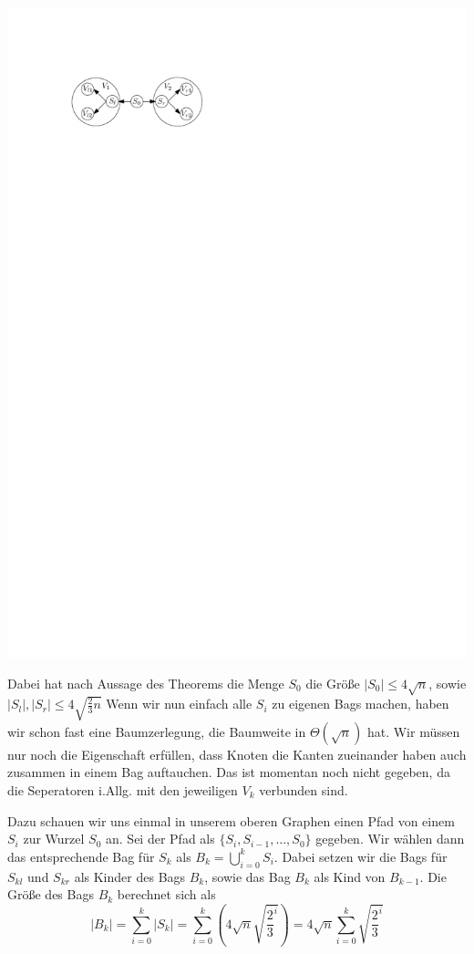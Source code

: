 \begin{center}
    \vspace{1ex}
    \includegraphics[page=1]{fig/02-A3}
  \end{center}

Dabei hat nach Aussage des Theorems die Menge $S_0$ die Größe $|S_0| \leq 4\sqrt{n}$, sowie $|S_l|,|S_r| \leq 4\sqrt{\frac{2}{3}n}$
Wenn wir nun einfach alle $S_i$ zu eigenen Bags machen, haben wir schon fast eine Baumzerlegung, die Baumweite in $\Theta(\sqrt{n})$ hat.
Wir müssen nur noch die Eigenschaft erfüllen, dass Knoten die Kanten zueinander haben auch zusammen in einem Bag auftauchen. Das ist momentan noch nicht gegeben, da die Seperatoren i.Allg. mit den jeweiligen $V_k$ verbunden sind.

Dazu schauen wir uns einmal in unserem oberen Graphen einen Pfad von einem $S_i$ zur Wurzel $S_0$ an. Sei der Pfad als $\{S_i, S_{i-1}, \dots, S_0\}$ gegeben.
Wir wählen dann das entsprechende Bag für $S_k$ als $B_k = \bigcup\limits_{i=0}^k S_i$. Dabei setzen wir die Bags für $S_{kl}$ und $S_{kr}$ als Kinder des Bags $B_k$, sowie das Bag $B_k$ als Kind von $B_{k-1}$.
Die Größe des Bags $B_k$ berechnet sich als
$$ |B_k| = \sum\limits_{i=0}^k |S_k| = \sum\limits_{i=0}^k \left(4\sqrt{n}\sqrt{\frac{2}{3}^i}\right) = 4\sqrt{n}\sum\limits_{i=0}^k \sqrt{\frac{2}{3}^i}$$

